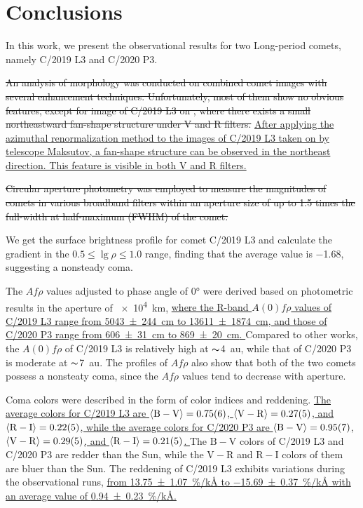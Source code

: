 \section{Conclusions} \label{sec:con}
In this work, we present the observational results for two Long-period comets, namely C/2019 L3 and C/2020 P3. 

\st{An analysis of morphology was conducted on combined comet images with several enhancement techniques. Unfortunately, most of them show no obvious features, except for image of C/2019 L3 on , where there exists a small northeastward fan-shape structure under V and R filters. }
\ul{
    After applying the azimuthal renormalization method to the images of C/2019 L3 taken on  by telescope Maksutov, a fan-shape structure can be observed in the northeast direction. This feature is visible in both V and R filters. 
}

\st{Circular aperture photometry was employed to measure the magnitudes of comets in various broadband filters within an aperture size of up to 1.5 times the full-width at half-maximum (FWHM) of the comet. }

We get the surface brightness profile for comet C/2019 L3 and calculate the gradient in the $0.5 \leqslant \lg{\rho} \leqslant 1.0$ range, finding that the average value is \num{-1.68}, suggesting a nonsteady coma. 

The $Af\rho$ values adjusted to phase angle of \ang{0} were derived based on photometric results in the aperture of \SI{e4}{\km}, 
\ul{
    where the R-band $A(0)f\rho$ values of C/2019 L3 range from {\SI{5043 +- 244}{\cm}} to {\SI{13611 +- 1874}{\cm}}, and those of C/2020 P3 range from {\SI{606 +- 31}{\cm}} to {\SI{869 +- 20}{\cm}}. 
}
Compared to other works, the $A(0)f\rho$ of C/2019 L3 is relatively high at $\thicksim${\SI{4}{\astronomicalunit}}, while that of C/2020 P3 is moderate at $\thicksim${\SI{7}{\astronomicalunit}}. The profiles of $Af\rho$ also show that both of the two comets possess a nonsteaty coma, since the $Af\rho$ values tend to decrease with aperture. 

Coma colors were described in the form of color indices and reddening. 
\ul{
    The average colors for C/2019 L3 are  
$\langle \mathrm{B} - \mathrm{V} \rangle = \num{0.75 +- 0.06}$, 
$\langle \mathrm{V} - \mathrm{R} \rangle = \num{0.27 +- 0.05}$, and 
$\langle \mathrm{R} - \mathrm{I} \rangle = \num{0.22 +- 0.05}$,  
while the average colors for C/2020 P3 are 
$\langle \mathrm{B} - \mathrm{V} \rangle = \num{0.95 +- 0.07}$, 
$\langle \mathrm{V} - \mathrm{R} \rangle = \num{0.29 +- 0.05}$, and 
$\langle \mathrm{R} - \mathrm{I} \rangle = \num{0.21 +- 0.05}$. 
}
The $\mathrm{B} - \mathrm{V}$ colors of C/2019 L3 and C/2020 P3 are redder than the Sun, while the $\mathrm{V} - \mathrm{R}$ and $\mathrm{R} - \mathrm{I}$ colors of them are bluer than the Sun. The reddening of C/2019 L3 exhibits variations during the observational runs, 
\ul{
    from {\SI{13.75 +- 1.07}{\percent/\kilo\angstrom}} to {\SI{-15.69 +- 0.37}{\percent/\kilo\angstrom}} with an average value of {\SI{0.94 +- 0.23}{\percent/\kilo\angstrom}}. 
}

